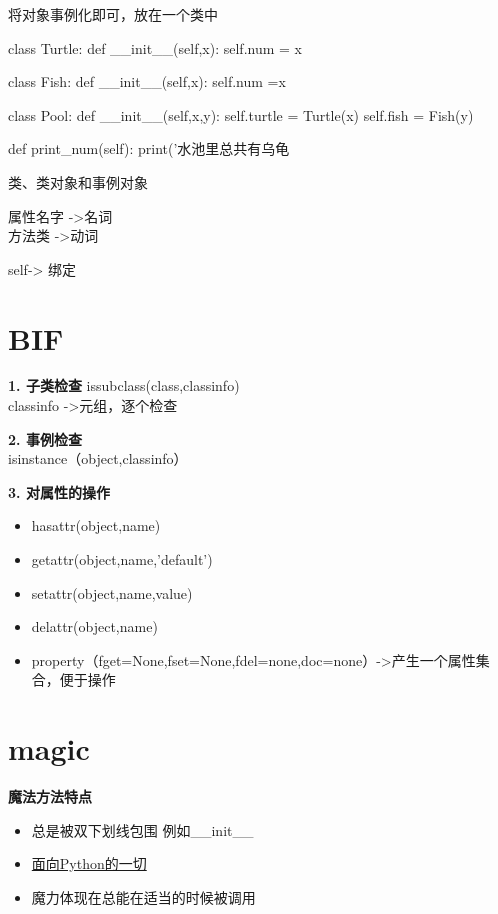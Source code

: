 \documentclass[a4paper,10pt]{ctexart}
\begin{document}
将对象事例化即可，放在一个类中
\begin{python}
class Turtle:
    def __init__(self,x):
        self.num = x

class Fish:
    def __init__(self,x):
        self.num =x

class Pool:
    def __init__(self,x,y):
        self.turtle = Turtle(x)
        self.fish = Fish(y)

    def print_num(self):
        print('水池里总共有乌龟%
\end{python}


类、类对象和事例对象

属性名字 ->名词\\
方法类     ->动词

self-> 绑定
\section{BIF}
\textbf{1. 子类检查}
issubclass(class,classinfo)\\
classinfo ->元组，逐个检查

\textbf{2. 事例检查}\\
isinstance（object,classinfo）

\textbf{3. 对属性的操作}\\
\begin{itemize}
  \item hasattr(object,name)
  \item getattr(object,name,'default')
  \item setattr(object,name,value)
  \item delattr(object,name)
  \item property（fget=None,fset=None,fdel=none,doc=none）->产生一个属性集合，便于操作
\end{itemize}

\section{magic}
\textbf{魔法方法特点}
\begin{itemize}
  \item 总是被双下划线包围 例如\_\_init\_\_
  \item \uline{面向Python的一切}
  \item 魔力体现在总能在适当的时候被调用
\end{itemize}

\end{document}
